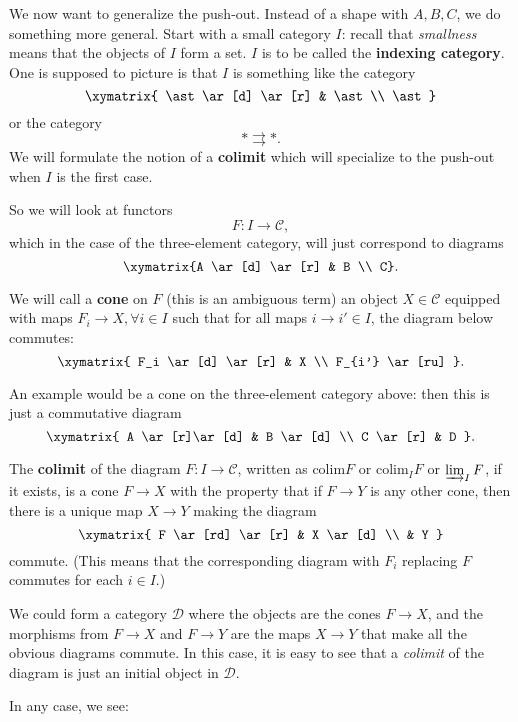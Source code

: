 \begin{proposition}
We now want to generalize the push-out.
Instead of a shape with $A,B,C$, we do something more general.
Start with a small category $I$: recall that \emph{smallness} means that the objects of $I$
form a set. $I$ is to be called  the  \textbf{indexing
category}. One is supposed to picture
is that $I$ is something like the category
\[
\xymatrix{
\ast \ar[d] \ar[r] &  \ast \\
\ast
}
\]
or the category
\[ \ast \rightrightarrows \ast.  \]
We will formulate the notion of a \textbf{colimit} which will specialize to the
push-out when $I$ is the first case. 


So we will look at functors
\[ F: I \to \mathcal{C},  \]
which in the case of the three-element category, will just
 correspond to
diagrams
\[ \xymatrix{A \ar[d]  \ar[r] &  B \\ C}.  \]

We will call a \textbf{cone} on $F$ (this is an ambiguous term) an object $X
\in \mathcal{C}$ equipped with maps $F_i \to X, \forall i \in I$ such that for
all maps $i \to
i' \in I$, the diagram below commutes:
\[ \xymatrix{
F_i \ar[d] \ar[r] &  X \\
F_{i'} \ar[ru]
}.\]

An example would be a cone on the three-element category above: then
this is just a commutative diagram
\[ \xymatrix{
A \ar[r]\ar[d]  &  B \ar[d]  \\
C \ar[r] &  D
}.\]

\newcommand{\colim}{\mathrm{colim}}

\begin{definition}
The \textbf{colimit} of the diagram $F: I \to \mathcal{C}$, written as $\colim
F$ or $\colim_I F $ or $\varinjlim_I F$, if it exists, is a cone $F \to X$ with
the property that if $F \to Y$ is any other cone, then there is a unique map $X
\to Y$ making the diagram
\[ \xymatrix{
F  \ar[rd] \ar[r] &  X \ar[d]  \\
& Y
}\]
commute. (This means that the corresponding diagram with $F_i$ replacing $F$
commutes for each $i \in I$.)
\end{definition}

We could form a category $\mathcal{D}$ where the objects are the cones $F \to
X$, and the morphisms from $F \to X$ and $F \to Y$ are the maps $X \to Y$ that
make all the obvious diagrams commute. In this case, it is easy to see that a
\emph{colimit} of the diagram is just an initial object in $\mathcal{D}$.

 In any case, we see:


\end{proposition}
